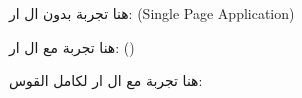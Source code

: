 \documentclass{article}
\begin{document}
\setRTL
هنا تجربة بدون ال ار: (Single Page Application)

هنا تجربة مع ال ار: ()

هنا تجربة مع ال ار لكامل القوس: 
\end{document}
